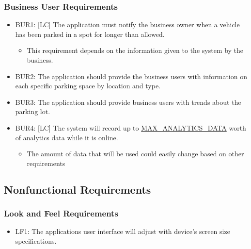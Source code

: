 \documentclass[]{article}
\begin{document}
\subsubsection{Business User Requirements}
\begin{itemize}
	\item BUR1: [LC] The application must notify the business owner when a vehicle has been parked in a spot for longer than allowed.
	\begin{itemize}
		\item This requirement depends on the information given to the system by the business.
	\end{itemize}
	\item BUR2:  The application should provide the business users with information on each specific parking space by location and type.
	\item BUR3: The application should provide business users with trends about the parking lot.
	\item BUR4: [LC] The system will record up to \hyperlink{ANALYTICSDATA}{MAX\_ANALYTICS\_DATA} worth of analytics data while it is online.
	\begin{itemize}
		\item The amount of data that will be used could easily change based on other requirements
	\end{itemize}
\end{itemize}

	
	

	
\subsection{Nonfunctional Requirements}
\subsubsection{Look and Feel Requirements}
\begin{itemize}
	\item LF1: The applications user interface will adjust with device’s screen size specifications.
\end{itemize}
\end{document}
